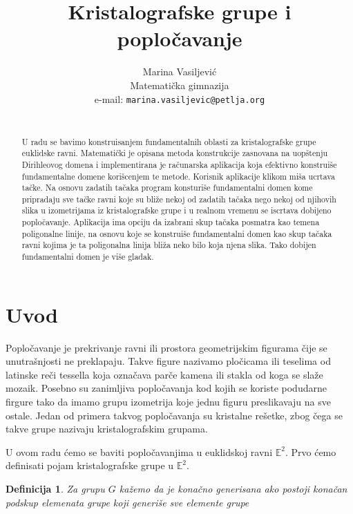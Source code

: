 \documentclass[11pt]{article}
\title{Kristalografske grupe i poplo\v cavanje}
\author{
Marina Vasiljevi\' c \\
Matemati\v cka gimnazija \\
e-mail: \tt{marina.vasiljevic@petlja.org} \\
\\
 }
\newtheorem{definition}[theorem]{\bf Definicija}
\begin{document}
 
    
    \maketitle
    
    
\begin{abstract}
U radu se bavimo konstruisanjem fundamentalnih oblasti za kristalografske grupe euklidske ravni. Matemati\v cki je opisana metoda konstrukcije zasnovana na uop\v stenju Dirihleovog domena i implementirana je ra\v cunarska aplikacija koja efektivno konstrui\v se fundamentalne domene kori\v scenjem te metode. Korisnik aplikacije klikom mi\v sa ucrtava ta\v cke. Na osnovu zadatih ta\v caka program konsturi\v se fundamentalni domen kome pripradaju sve ta\v cke ravni koje su bli\v ze nekoj od zadatih ta\v caka nego nekoj od njihovih slika u izometrijama iz kristalografske grupe i u realnom vremenu se iscrtava dobijeno poplo\v cavanje. Aplikacija ima opciju da izabrani skup ta\v caka posmatra kao temena poligonalne linije, na osnovu koje se konstrui\v se fundamentalni domen kao skup ta\v caka ravni kojima je ta poligonalna linija bli\v za neko bilo koja njena slika. Tako dobijen fundamentalni domen je vi\v se gladak. 
\end{abstract}

\section{Uvod}\label{kristalografske-grupe-i-poploux10davanje}

Popločavanje je prekrivanje ravni ili prostora geometrijskim figurama čije se unutrašnjosti ne preklapaju. Takve figure nazivamo pločicama ili teselima od latinske reči tessella koja označava parče kamena ili stakla od koga se slaže mozaik. Posebno
su zanimljiva popločavanja kod kojih se koriste podudarne firgure tako
da imamo grupu izometrija koje jednu figuru preslikavaju na sve ostale.
Jedan od primera takvog popločavanja su kristalne rešetke, zbog čega se
takve grupe nazivaju kristalografskim grupama.

U ovom radu ćemo se baviti popločavanjima u euklidskoj ravni
\(\mathbb{E}^2\). Prvo ćemo definisati pojam kristalografske grupe u
\(\mathbb{E}^2\).

\begin{definition} Za grupu \(G\) kažemo da je konačno
generisana ako postoji konačan podskup elemenata grupe koji generiše sve
elemente grupe
\end{definition}
\end{document}

